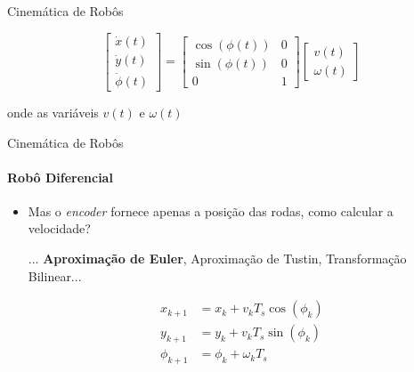 \documentclass{beamer}
\begin{document}
\begin{frame}{Cinemática de Robôs}
\begin{itemize}
              \begin{equation*}
                  \boxed{
                      \begin{bmatrix}
                          \dot{x}(t) \\
                          \dot{y}(t) \\
                          \dot{\phi}(t)
                      \end{bmatrix}
                      =
                      \begin{bmatrix}
                          \cos(\phi(t)) & 0 \\
                          \sin(\phi(t)) & 0 \\
                          0             & 1
                      \end{bmatrix}
                      \begin{bmatrix}
                          v(t) \\
                          \omega(t)
                      \end{bmatrix}}
              \end{equation*}

              onde as variáveis $v(t)$ e $\omega(t)$


    \end{itemize}
\end{frame}


\begin{frame}{Cinemática de Robôs}
    \framesubtitle{Robô Diferencial}
    \begin{itemize}
        \item Mas o \textit{encoder} fornece apenas a posição das rodas, como calcular a velocidade?

              ... \textbf{Aproximação de Euler}, Aproximação de Tustin, Transformação Bilinear...

              \begin{equation*}
                  \begin{split}
                      x_{k+1} &= x_k + v_k T_s\cos(\phi_k) \\
                      y_{k+1} &= y_k + v_k T_s\sin(\phi_k) \\
                      \phi_{k+1} &= \phi_k + \omega_k T_s \\
                  \end{split}
              \end{equation*}
    \end{itemize}
\end{frame}
\end{document}
